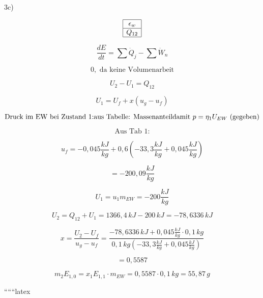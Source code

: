 3c)

\[
\begin{array}{|c|}
\hline
\epsilon_w \\
\hline
Q_{12} \\
\hline
\end{array}
\]

\[
\frac{dE}{dt} = \sum \dot{Q}_j - \sum \dot{W}_n
\]

\[
0, \text{ da keine Volumenarbeit}
\]

\[
U_2 - U_1 = Q_{12}
\]

\[
U_1 = U_f + x (u_g - u_f)
\]

\[
\text{Druck im EW bei Zustand 1:} \\
\text{aus Tabelle: Massenanteil} \\
\text{damit } p = \eta_1 U_{EW} \text{ (gegeben)}
\]

\[
\text{Aus Tab 1:}
\]

\[
u_f = -0,045 \frac{kJ}{kg} + 0,6 \left( -33,3 \frac{kJ}{kg} + 0,045 \frac{kJ}{kg} \right)
\]

\[
= -200,09 \frac{kJ}{kg}
\]

\[
U_1 = u_1 m_{EW} = -200 \frac{kJ}{kg}
\]

\[
U_2 = Q_{12} + U_1 = 1366,4 \, kJ - 200 \, kJ = -78,6336 \, kJ
\]

\[
x = \frac{U_2 - U_f}{u_g - u_f} = \frac{-78,6336 \, kJ + 0,045 \frac{kJ}{kg} \cdot 0,1 \, kg}{0,1 \, kg \left( -33,3 \frac{kJ}{kg} + 0,045 \frac{kJ}{kg} \right)}
\]

\[
= 0,5587
\]

\[
m_2 E_{1,0} = x_1 E_{1,1} \cdot m_{EW} = 0,5587 \cdot 0,1 \, kg = 55,87 \, g
\]

``````latex